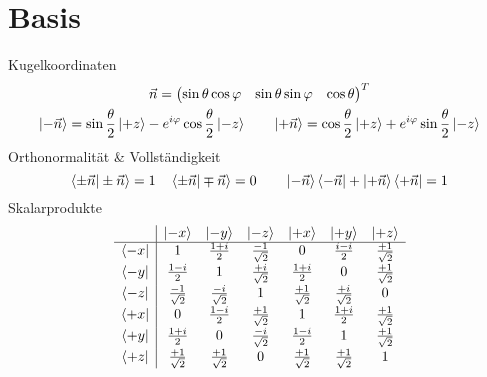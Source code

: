\section{Basis}

Kugelkoordinaten \cite[Glg. 2.28]{qm}
\begin{gather*}
	\vec{n} = \begin{pmatrix} \sin\theta\cos\varphi & \sin\theta\sin\varphi & \cos\theta \end{pmatrix}^T \\
	\ket{-\vec{n}}=\sin\frac{\theta}{2}\ket{+z}-e^{i\varphi}\cos\frac{\theta}{2}\ket{-z} \qquad \ket{+\vec{n}}=\cos\frac{\theta}{2}\ket{+z}+e^{i\varphi}\sin \frac{\theta}{2}\ket{-z}
\end{gather*}
Orthonormalität \& Vollständigkeit \cite[Glg. 2.21, 2.23]{qm}
\begin{equation*}
    \braket{\pm\vec{n}|\pm\vec{n}}=1 \quad \braket{\pm\vec{n}|\mp\vec{n}}=0 \qquad \ket{-\vec{n}}\bra{-\vec{n}}+\ket{+\vec{n}}\bra{+\vec{n}}=1
\end{equation*}
Skalarprodukte \cite[Folg. aus Tab. nach Glg. 2.28,]{qm}
\begin{equation*}
    \begin{array}{c | ccc ccc}
                 & \ket{-x}            & \ket{-y}            & \ket{-z}            & \ket{+x}            & \ket{+y}            & \ket{+z} \\
        \hline
        \bra{-x} & 1                   &\frac{1+i}{2}        & \frac{-1}{\sqrt{2}} & 0                   & \frac{i-i}{2}       & \frac{+1}{\sqrt{2}} \\[3pt]
        \bra{-y} & \frac{1-i}{2}       & 1                   & \frac{+i}{\sqrt{2}} & \frac{1+i}{2}       & 0                   & \frac{+1}{\sqrt{2}} \\[3pt]
        \bra{-z} & \frac{-1}{\sqrt{2}} & \frac{-i}{\sqrt{2}} & 1                   & \frac{+1}{\sqrt{2}} & \frac{+i}{\sqrt{2}} & 0 \\[3pt]
        \bra{+x} & 0                   & \frac{1-i}{2}       & \frac{+1}{\sqrt{2}} & 1                   & \frac{1+i}{2}       & \frac{+1}{\sqrt{2}} \\[3pt]
        \bra{+y} & \frac{1+i}{2}       & 0                   & \frac{-i}{\sqrt{2}} & \frac{1-i}{2}       & 1                   & \frac{+1}{\sqrt{2}} \\[3pt]
        \bra{+z} & \frac{+1}{\sqrt{2}} & \frac{+1}{\sqrt{2}} & 0                   & \frac{+1}{\sqrt{2}} & \frac{+1}{\sqrt{2}} & 1 \\
    \end{array}
\end{equation*}
